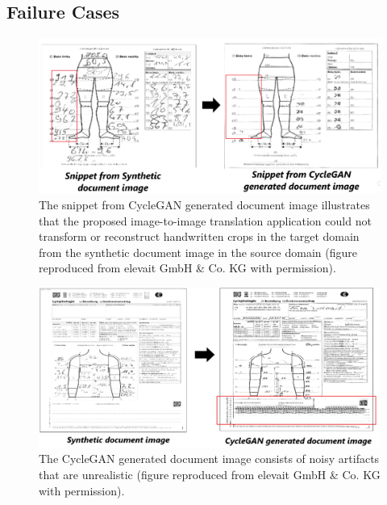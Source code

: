 \subsection{Failure Cases}\label{FailureCases}

\begin{figure}[H]
        \begin{center}
	    \includegraphics[scale=0.28]{images/Evaluation/failure1.png}
	    \caption[The snippet from \ac{CycleGAN} generated document image illustrates that the proposed image-to-image translation application could not transform or reconstruct handwritten crops in the target domain from the synthetic document image in the source domain.]{The snippet from \ac{CycleGAN} generated document image illustrates that the proposed image-to-image translation application could not transform or reconstruct handwritten crops in the target domain from the synthetic document image in the source domain (figure reproduced from elevait GmbH \& Co. KG with permission).}
	    \label{fig:failure1}
	    \end{center}
\end{figure}

\begin{figure}[H]
        \begin{center}
	    \includegraphics[scale=0.50]{images/Evaluation/failure2.png}
	    \caption[The \ac{CycleGAN} generated document image consists of noisy artifacts that are unrealistic.]{The \ac{CycleGAN} generated document image consists of noisy artifacts that are unrealistic (figure reproduced from elevait GmbH \& Co. KG with permission).}
	    \label{fig:failure2}
	    \end{center}
\end{figure}

